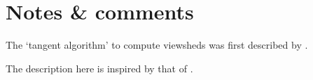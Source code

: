 







%
\section{Notes \& comments}

The `tangent algorithm' to compute viewsheds was first described by \citet{Blelloch90}.

The description here is inspired by that of \citet{DeFloriani99-1}.


